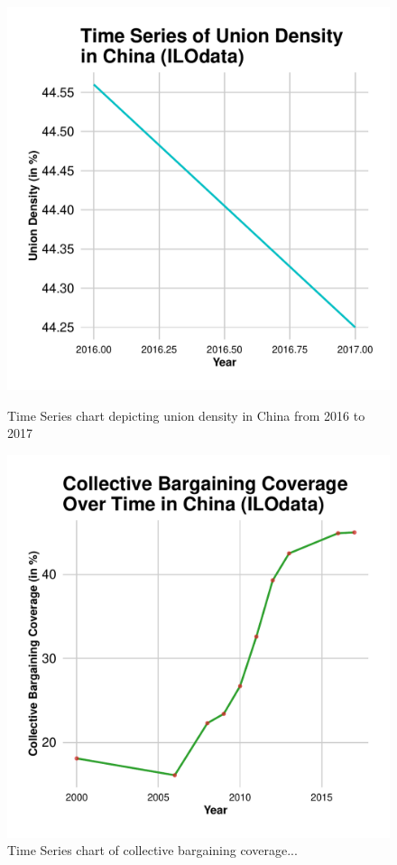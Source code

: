 \documentclass[11pt]{article}\usepackage[]{graphicx}\usepackage[]{xcolor}
\newenvironment{knitrout}{}{} %
\begin{document}
\clearpage
\begin{figure}[h!]
  \centering
  \begin{minipage}{0.48\linewidth}
\begin{knitrout}
\color{fgcolor}

{\centering \includegraphics[width=0.7\linewidth]{figure/Chinatradeuniondensity-1} 

}


\end{knitrout}
    \caption{Time Series chart depicting union density in China from 2016 to 2017}
    \label{fig:union-density-china}
  \end{minipage}
  \hfill %
  \begin{minipage}{0.48\linewidth}
\begin{knitrout}
\color{fgcolor}

{\centering \includegraphics[width=0.7\linewidth]{figure/ChinaCollectiveBargaining-1} 

}


\end{knitrout}
    \caption{Time Series chart of collective bargaining coverage...}
    \label{fig:china-collective-bargaining}
  \end{minipage}
\end{figure}
\end{document}
